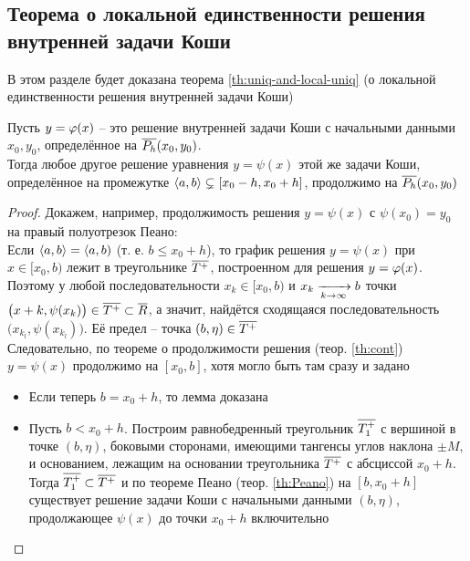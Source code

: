 \subsection{Теорема о локальной единственности решения внутренней задачи Коши}

В этом разделе будет доказана теорема \ref{th:uniq-and-local-uniq} (о локальной единственности решения внутренней задачи Коши)

\begin{lemma}
    Пусть $ y = \varphi(x) $ -- это решение внутренней задачи Коши с начальными данными $ x_0, y_0 $, определённое на $ \overline{P_h}(x_0, y_0) $. \\
    Тогда любое другое решение уравнения  $ y = \psi(x) $ этой же задачи Коши, определённое на промежутке $ \Braket{a, b} \subsetneq [x_0 - h, x_0 + h] $, продолжимо на $ \overline{P_h}(x_0, y_0) $
\end{lemma}

\begin{proof}
	Докажем, например, продолжимость решения $ y = \psi(x) $ с $ \psi(x_0) = y_0 $ на правый полуотрезок Пеано: \\
    Если $ \Braket{a, b} = \langle a, b) $ (т. е. $ b \le x_0 + h $), то график решения $ y = \psi(x) $ при $ x \in [x_0, b) $ лежит в треугольнике $ \overline{T^+} $, построенном для решения $ y = \varphi(x) $. Поэтому у любой последовательности $ x_k \in [x_0, b) $ и $ x_k \xrightarrow[{k} \to {\infty}]{} b $ точки $ \big( x+k, \psi(x_k) \big) \in \overline{T^+} \subset \overline{R} $, а значит, найдётся сходящаяся последовательность $ \big( x_{k_l}, \psi(x_{k_l}) \big) $. Её предел -- точка $ (b, \eta) \in \overline{T^+} $ \\
    Следовательно, по теореме о продолжимости решения (теор. \ref{th:cont}) $ y = \psi(x) $ продолжимо на $ [x_0, b] $, хотя могло быть там сразу и задано
    \begin{itemize}
        \item Если теперь $ b = x_0 + h $, то лемма доказана
        \item Пусть $ b < x_0 + h $. Построим равнобедренный треугольник $ \overline{T_1^+} $ с вершиной в точке $ (b, \eta) $, боковыми сторонами, имеющими тангенсы углов наклона $ \pm M $, и основанием, лежащим на основании треугольника $ \overline{T^+} $ с абсциссой $ x_0 + h $. Тогда $ \overline{T_1^+} \subset \overline{T^+} $ и по теореме Пеано (теор. \ref{th:Peano}) на $ [b, x_0 + h] $ существует решение задачи Коши с начальными данными $ (b, \eta) $, продолжающее $ \psi(x) $ до точки $ x_0 + h $ включительно
    \end{itemize}
\end{proof}

